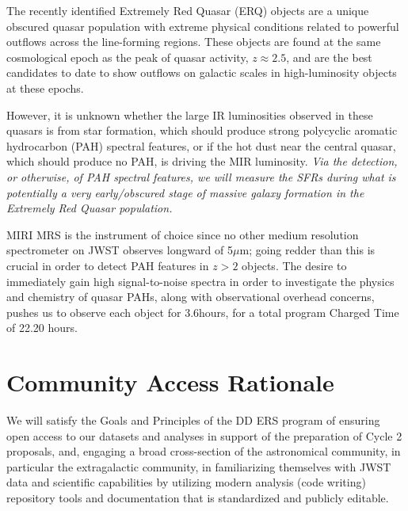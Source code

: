 \smallskip \smallskip
\noindent
The recently identified Extremely Red Quasar (ERQ) objects are a
unique obscured quasar population with extreme physical conditions
related to powerful outflows across the line-forming regions. These
objects are found at the same cosmological epoch as the peak of quasar
activity, $z\approx2.5$, and are the best candidates to date to show
outflows on galactic scales in high-luminosity objects at these epochs. 

\smallskip \smallskip
\noindent
However, it is unknown whether the large IR luminosities observed in 
these quasars is from star formation, which should produce strong 
polycyclic aromatic hydrocarbon (PAH) spectral features, 
or if the hot dust near the central quasar, which should produce no PAH, 
is driving the MIR luminosity. 
{\it Via the detection, or otherwise, of PAH spectral features, we will 
measure the SFRs during what is potentially a very early/obscured stage 
of massive galaxy formation in the Extremely Red Quasar population.}

\smallskip \smallskip
\noindent
MIRI MRS is the instrument of choice since no other medium resolution
spectrometer on JWST observes longward of 5$\mu$m; going redder than
this is crucial in order to detect PAH features in $z>2$ objects.  The
desire to immediately gain high signal-to-noise spectra in order to
investigate the physics and chemistry of quasar PAHs, along with
observational overhead concerns, pushes us to observe each object for
3.6hours, for a total program Charged Time of 22.20 hours.



\section*{Community Access Rationale}
\vspace{-6pt}
\noindent
We will satisfy the Goals and Principles of the DD ERS program of
ensuring open access to our datasets and analyses in support of the
preparation of Cycle 2 proposals, and, engaging a broad cross-section
of the astronomical community, in particular the extragalactic
community, in familiarizing themselves with JWST data and scientific
capabilities by utilizing modern analysis (code writing) repository
tools and documentation that is standardized and publicly editable.

